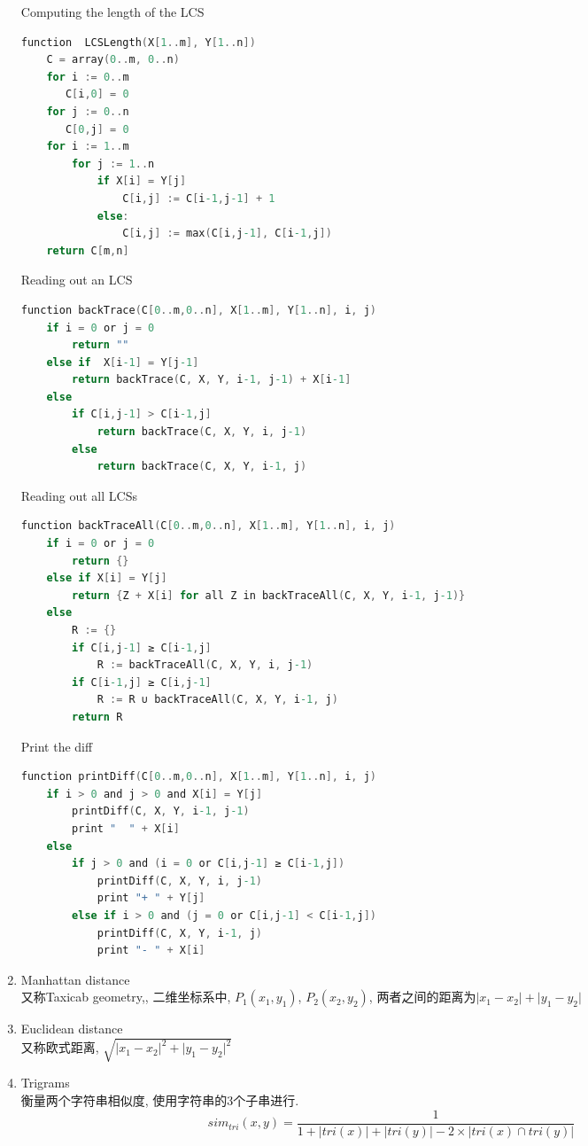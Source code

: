 \documentclass[a4paper,10pt,english]{article}
\begin{document}
\begin{enumerate}
Computing the length of the LCS
\begin{lstlisting}[language=C]
function  LCSLength(X[1..m], Y[1..n])
    C = array(0..m, 0..n)
    for i := 0..m
       C[i,0] = 0
    for j := 0..n
       C[0,j] = 0
    for i := 1..m
        for j := 1..n
            if X[i] = Y[j]
                C[i,j] := C[i-1,j-1] + 1
            else:
                C[i,j] := max(C[i,j-1], C[i-1,j])
    return C[m,n]
\end{lstlisting}
Reading out an LCS
\begin{lstlisting}[language=C]
function backTrace(C[0..m,0..n], X[1..m], Y[1..n], i, j)
    if i = 0 or j = 0
        return ""
    else if  X[i-1] = Y[j-1]
        return backTrace(C, X, Y, i-1, j-1) + X[i-1]
    else
        if C[i,j-1] > C[i-1,j]
            return backTrace(C, X, Y, i, j-1)
        else
            return backTrace(C, X, Y, i-1, j)
\end{lstlisting}
Reading out all LCSs
\begin{lstlisting}[language=C]
function backTraceAll(C[0..m,0..n], X[1..m], Y[1..n], i, j)
    if i = 0 or j = 0
        return {}
    else if X[i] = Y[j]
        return {Z + X[i] for all Z in backTraceAll(C, X, Y, i-1, j-1)}
    else
        R := {}
        if C[i,j-1] ≥ C[i-1,j]
            R := backTraceAll(C, X, Y, i, j-1)
        if C[i-1,j] ≥ C[i,j-1]
            R := R ∪ backTraceAll(C, X, Y, i-1, j)
        return R
\end{lstlisting}

Print the diff
\begin{lstlisting}[language=C]
function printDiff(C[0..m,0..n], X[1..m], Y[1..n], i, j)
    if i > 0 and j > 0 and X[i] = Y[j]
        printDiff(C, X, Y, i-1, j-1)
        print "  " + X[i]
    else
        if j > 0 and (i = 0 or C[i,j-1] ≥ C[i-1,j])
            printDiff(C, X, Y, i, j-1)
            print "+ " + Y[j]
        else if i > 0 and (j = 0 or C[i,j-1] < C[i-1,j])
            printDiff(C, X, Y, i-1, j)
            print "- " + X[i]

\end{lstlisting}


\item{Manhattan distance}\\
又称Taxicab geometry,, 二维坐标系中, $P_1(x_1, y_1)$, $P_2(x_2, y_2)$, 两者之间的距离为$ \lvert x_1 - x_2\rvert+ \lvert y_1 - y_2\rvert $

\item{Euclidean distance}\\
又称欧式距离, $ \sqrt{\lvert x_1 - x_2\rvert^{2}+ \lvert y_1 - y_2\rvert^{2}} $


\item{Trigrams}\\
衡量两个字符串相似度, 使用字符串的3个子串进行.
$$ sim_{tri}(x, y) = \frac{1}{1+\lvert tri(x) \rvert+\lvert tri(y) \rvert-2 \times \lvert tri(x)\cap tri(y) \rvert} $$

\end{enumerate}
\end{document}
